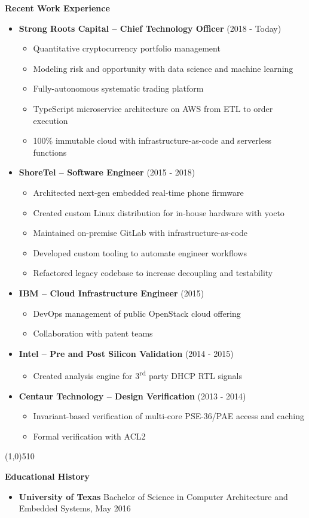 \documentclass{report}
\newcommand{\cut}{\begin{center} \line(1,0){510} \end{center}}
\begin{document}
\textbf{Recent Work Experience}
\begin{itemize}[label=$\cdot$]

\item \textbf{Strong Roots Capital -- Chief Technology Officer} (2018 - Today)
  \begin{itemize}[label=$\circ$]
  \item Quantitative cryptocurrency portfolio management
  \item Modeling risk and opportunity with data science and machine learning
  \item Fully-autonomous systematic trading platform
  \item TypeScript microservice architecture on AWS from ETL to order execution
  \item 100\% immutable cloud with infrastructure-as-code and serverless functions
  \end{itemize}

\item \textbf{ShoreTel -- Software Engineer} (2015 - 2018)
  \begin{itemize}[label=$\circ$]
  \item Architected next-gen embedded real-time phone firmware
  \item Created custom Linux distribution for in-house hardware with yocto
  \item Maintained on-premise GitLab with infrastructure-as-code
  \item Developed custom tooling to automate engineer workflows
  \item Refactored legacy codebase to increase decoupling and testability
  \end{itemize}

\item \textbf{IBM -- Cloud Infrastructure Engineer} (2015)
  \begin{itemize}[label=$\circ$]
  \item DevOps management of public OpenStack cloud offering
  \item Collaboration with patent teams
  \end{itemize}

\item \textbf{Intel -- Pre and Post Silicon Validation} (2014 - 2015)
  \begin{itemize}[label=$\circ$]
  \item Created analysis engine for 3\textsuperscript{rd} party DHCP RTL signals
  \end{itemize}

\item \textbf{Centaur Technology -- Design Verification} (2013 - 2014)
  \begin{itemize}[label=$\circ$]
  \item Invariant-based verification of multi-core PSE-36/PAE access and caching
  \item Formal verification with ACL2
  \end{itemize}

\end{itemize}

\cut{}

\textbf{Educational History}
\begin{itemize}[label=$\cdot$]
\item \textbf{University of Texas} Bachelor of Science in Computer Architecture and Embedded Systems, May 2016
\end{itemize}
\end{document}
